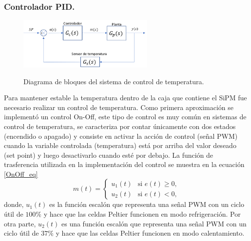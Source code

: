 \subsubsection{Controlador PID.}
\begin{figure}[h!]
\begin{centering}
    \caption{Diagrama de bloques del sistema de control de temperatura.}
    \includegraphics[width=0.6\textwidth]{Images/DiagramaOnOff.png}
    \label{fig:DiagramaOnOff}
  \par\end{centering}
\end{figure}
Para mantener estable la temperatura dentro de la caja que contiene el SiPM fue necesario realizar un control de temperatura. Como primera aproximación se implementó un control On-Off, este tipo de control es muy común en sistemas de control de temperatura, se caracteriza por contar únicamente con dos estados (encendido o apagado) y consiste en activar la acción de control (señal PWM) cuando la variable controlada (temperatura) está por arriba del valor deseado (set point) y luego desactivarlo cuando esté por debajo. La función de trasferencia utilizada en la implementación del control se muestra en la ecuación \ref{OnOff_eq} 
\begin{equation}
  m(t) = \left \{ \begin{matrix} u_{1}(t) & \mbox{si }e(t) \ge 0,
\\u_{2}(t) & \mbox{si }e(t) < 0, \end{matrix}\right.
\label{OnOff_eq}
\end{equation}
donde, $u_{1}(t)$ es la función escalón que representa una señal PWM con un ciclo útil de $100\%$ y hace que las celdas Peltier funcionen en modo refrigeración. Por otra parte, $u_{2}(t)$ es una función escalón que representa una señal PWM con un ciclo útil de $37\%$ y hace que las celdas Peltier funcionen en modo calentamiento. 
